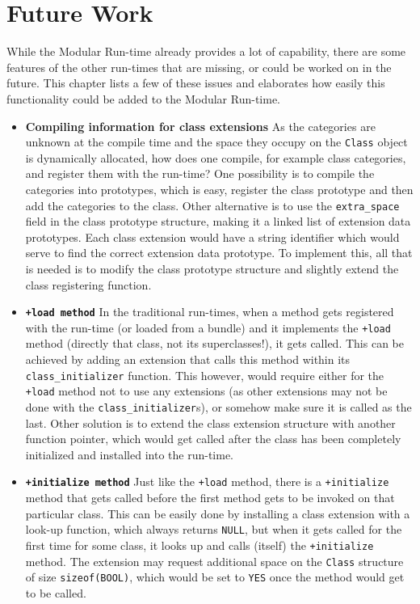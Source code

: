 \chapter{Future Work}

While the Modular Run-time already provides a lot of capability, there are some features of the other run-times that are missing, or could be worked on in the future. This chapter lists a few of these issues and elaborates how easily this functionality could be added to the Modular Run-time.

\begin{itemize}
  \item{\bf{Compiling information for class extensions}} As the categories are unknown at the compile time and the space they occupy on the \verb=Class= object is dynamically allocated, how does one compile, for example class categories, and register them with the run-time? One possibility is to compile the categories into prototypes, which is easy, register the class prototype and then add the categories to the class. Other alternative is to use the \verb=extra_space= field in the class prototype structure, making it a linked list of extension data prototypes. Each class extension would have a string identifier which would serve to find the correct extension data prototype. To implement this, all that is needed is to modify the class prototype structure and slightly extend the class registering function.
  \item{\bf{\tt{+load} method}} In the traditional run-times, when a method gets registered with the run-time (or loaded from a bundle) and it implements the \verb=+load= method (directly that class, not its superclasses!), it gets called. This can be achieved by adding an extension that calls this method within its \verb=class_initializer= function. This however, would require either for the \verb=+load= method not to use any extensions (as other extensions may not be done with the \verb=class_initializer=s), or somehow make sure it is called as the last. Other solution is to extend the class extension structure with another function pointer, which would get called after the class has been completely initialized and installed into the run-time.
  \item{\bf{\tt{+initialize} method}} Just like the \verb=+load= method, there is a \verb=+initialize= method that gets called before the first method gets to be invoked on that particular class. This can be easily done by installing a class extension with a look-up function, which always returns \verb=NULL=, but when it gets called for the first time for some class, it looks up and calls (itself) the \verb=+initialize= method. The extension may request additional space on the \verb=Class= structure of size \verb=sizeof(BOOL)=, which would be set to \verb=YES= once the method would get to be called.

\end{itemize}
